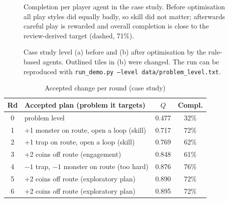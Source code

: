 \documentclass[conference]{IEEEtran}
\begin{document}
\begin{figure}[t]
\centering
{}
\caption{Completion per player agent in the case study. Before optimisation all play styles did
equally badly, so skill did not matter; afterwards careful play is rewarded and overall completion
is close to the review-derived target (dashed, 71\%).}
\label{fig:persona}
\end{figure}

\begin{figure}[t]
\centering

\caption{Case study level (a) before and (b) after optimisation by the rule-based agents. Outlined
tiles in (b) were changed. The run can be reproduced with
\texttt{run\_demo.py --level data/problem\_level.txt}.}
\label{fig:levels}
\end{figure}

\begin{table}[t]
\caption{Accepted change per round (case study)}
\label{tab:case}
\centering
\footnotesize
\begin{tabular}{@{}cp{44mm}cc@{}}
\toprule
Rd & Accepted plan (problem it targets) & $Q$ & Compl. \\
\midrule
0 & problem level & 0.477 & 32\% \\
1 & +1 monster on route, open a loop (skill) & 0.717 & 72\% \\
2 & +1 trap on route, open a loop (skill) & 0.769 & 62\% \\
3 & +2 coins off route (engagement) & 0.848 & 61\% \\
4 & $-1$ trap, $-1$ monster on route (too hard) & 0.876 & 76\% \\
5 & +2 coins off route (exploratory plan) & 0.890 & 72\% \\
6 & +2 coins off route (exploratory plan) & 0.895 & 72\% \\
\bottomrule
\end{tabular}
\end{table}
\end{document}
